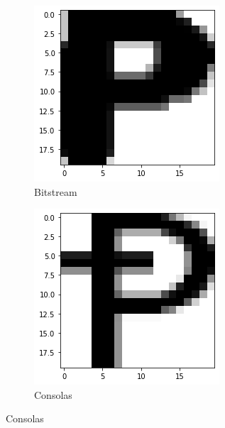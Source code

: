 \documentclass{homework}
\begin{document}
\begin{figure}[H]
\begin{subfigure}{0.4\textwidth}
\includegraphics[width=\linewidth]{bit_p.png}
\caption{Bitstream} \label{fig:a}
\end{subfigure}\hspace*{\fill}
\begin{subfigure}{0.4\textwidth}
\includegraphics[width=\linewidth]{con_p.png}
\caption{Consolas} \label{fig:b}
\end{subfigure}


\end{figure}
\end{document}
